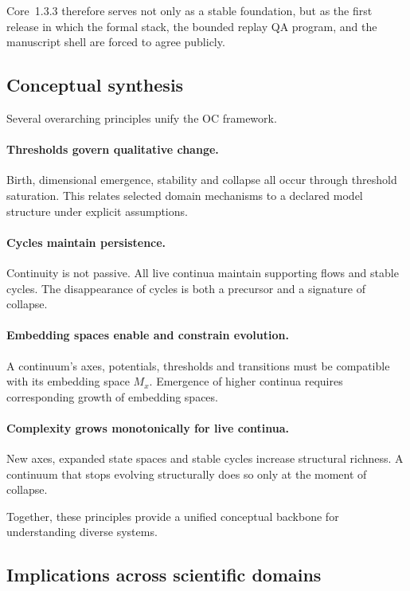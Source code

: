 Core~1.3.3 therefore serves not only as a stable foundation, but as the first
release in which the formal stack, the bounded replay QA program, and the
manuscript shell are forced to agree publicly.

\subsection{Conceptual synthesis}

Several overarching principles unify the OC framework.

\paragraph{Thresholds govern qualitative change.}
Birth, dimensional emergence, stability and collapse all occur through threshold saturation.  
This relates selected domain mechanisms to a declared model structure under explicit assumptions.

\paragraph{Cycles maintain persistence.}
Continuity is not passive.  
All live continua maintain supporting flows and stable cycles.  
The disappearance of cycles is both a precursor and a signature of collapse.

\paragraph{Embedding spaces enable and constrain evolution.}
A continuum’s axes, potentials, thresholds and transitions must be compatible with its embedding space \(M_x\).  
Emergence of higher continua requires corresponding growth of embedding spaces.

\paragraph{Complexity grows monotonically for live continua.}
New axes, expanded state spaces and stable cycles increase structural richness.  
A continuum that stops evolving structurally does so only at the moment of collapse.

Together, these principles provide a unified conceptual backbone for understanding diverse systems.

\subsection{Implications across scientific domains}

